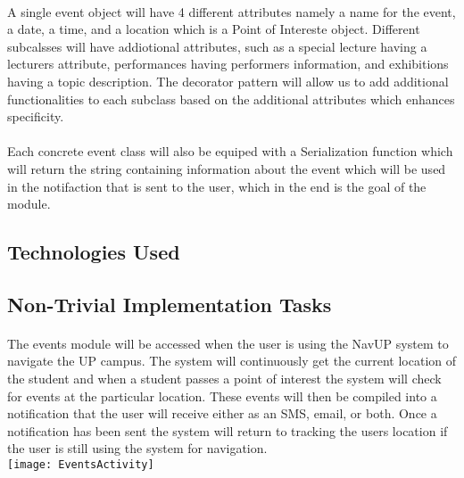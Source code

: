 \documentclass{article}
\begin{document}
\paragraph{} A single event object will have 4 different attributes namely a name for the event, a date, a time, and a location which is a Point of Intereste object. Different subcalsses will have addiotional attributes, such as a special lecture having a lecturers attribute, performances having performers information, and exhibitions having a topic description. The decorator pattern will allow us to add additional functionalities to each subclass based on the additional attributes which enhances specificity. 

\paragraph{} Each concrete event class will also be equiped with a Serialization function which will return the string containing information about the event which will be used in the notifaction that is sent to the user, which in the end is the goal of the module.  

\subsection{Technologies Used}
\paragraph{}


\subsection{Non-Trivial Implementation Tasks}
\paragraph{} The events module will be accessed when the user is using the NavUP system to navigate the UP campus. The system will continuously get the current location of the student and when a student passes a point of interest the system will check for events at the particular location. These events will then be compiled into a notification that the user will receive either as an SMS, email, or both. Once a notification has been sent the system will return to tracking the users location if the user is still using the system for navigation.\\
\newline
\texttt{[image: EventsActivity]}
\end{document}
